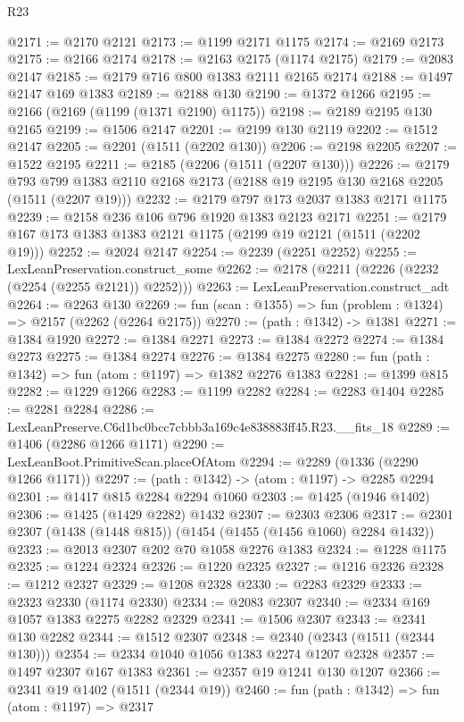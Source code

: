 \begin{lexlean}{R23}
\begin{coremodule}
@2171 := @2170 @2121
@2173 := @1199 @2171 @1175
@2174 := @2169 @2173
@2175 := @2166 @2174
@2178 := @2163 @2175 (@1174 @2175)
@2179 := @2083 @2147
@2185 := @2179 @716 @800 @1383 @2111 @2165 @2174
@2188 := @1497 @2147 @169 @1383
@2189 := @2188 @130
@2190 := @1372 @1266
@2195 := @2166 (@2169 (@1199 (@1371 @2190) @1175))
@2198 := @2189 @2195 @130 @2165
@2199 := @1506 @2147
@2201 := @2199 @130 @2119
@2202 := @1512 @2147
@2205 := @2201 (@1511 (@2202 @130))
@2206 := @2198 @2205
@2207 := @1522 @2195
@2211 := @2185 (@2206 (@1511 (@2207 @130)))
@2226 := @2179
    @793
    @799
    @1383
    @2110
    @2168
    @2173
    (@2188 @19 @2195 @130 @2168 @2205 (@1511 (@2207 @19)))
@2232 := @2179 @797 @173 @2037 @1383 @2171 @1175
@2239 := @2158 @236 @106 @796 @1920 @1383 @2123 @2171
@2251 := @2179 @167 @173 @1383 @1383 @2121 @1175 (@2199 @19 @2121 (@1511 (@2202 @19)))
@2252 := @2024 @2147
@2254 := @2239 (@2251 @2252)
@2255 := LexLeanPreservation.construct_some
@2262 := @2178 (@2211 (@2226 (@2232 (@2254 (@2255 @2121)) @2252)))
@2263 := LexLeanPreservation.construct_adt
@2264 := @2263 @130
@2269 := fun (scan : @1355) => fun (problem : @1324) => @2157 (@2262 (@2264 @2175))
@2270 := (path : @1342) -> @1381
@2271 := @1384 @1920
@2272 := @1384 @2271
@2273 := @1384 @2272
@2274 := @1384 @2273
@2275 := @1384 @2274
@2276 := @1384 @2275
@2280 := fun (path : @1342) => fun (atom : @1197) => @1382 @2276 @1383
@2281 := @1399 @815
@2282 := @1229 @1266
@2283 := @1199 @2282
@2284 := @2283 @1404
@2285 := @2281 @2284
@2286 := LexLeanPreserve.C6d1bc0bcc7cbbb3a169c4e838883ff45.R23.__fits_18
@2289 := @1406 (@2286 @1266 @1171)
@2290 := LexLeanBoot.PrimitiveScan.placeOfAtom
@2294 := @2289 (@1336 (@2290 @1266 @1171))
@2297 := (path : @1342) -> (atom : @1197) -> @2285 @2294
@2301 := @1417 @815 @2284 @2294 @1060
@2303 := @1425 (@1946 @1402)
@2306 := @1425 (@1429 @2282) @1432
@2307 := @2303 @2306
@2317 := @2301 @2307 (@1438 (@1448 @815)) (@1454 (@1455 (@1456 @1060) @2284 @1432))
@2323 := @2013 @2307 @202 @70 @1058 @2276 @1383
@2324 := @1228 @1175
@2325 := @1224 @2324
@2326 := @1220 @2325
@2327 := @1216 @2326
@2328 := @1212 @2327
@2329 := @1208 @2328
@2330 := @2283 @2329
@2333 := @2323 @2330 (@1174 @2330)
@2334 := @2083 @2307
@2340 := @2334 @169 @1057 @1383 @2275 @2282 @2329
@2341 := @1506 @2307
@2343 := @2341 @130 @2282
@2344 := @1512 @2307
@2348 := @2340 (@2343 (@1511 (@2344 @130)))
@2354 := @2334 @1040 @1056 @1383 @2274 @1207 @2328
@2357 := @1497 @2307 @167 @1383
@2361 := @2357 @19 @1241 @130 @1207
@2366 := @2341 @19 @1402 (@1511 (@2344 @19))
@2460 := fun (path : @1342) =>
  fun (atom : @1197) =>
  @2317

\end{coremodule}
\end{lexlean}
